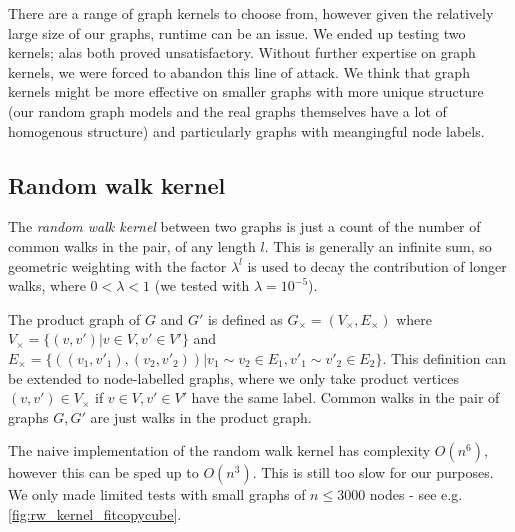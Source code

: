 




There are a range of graph kernels to choose from, however given the relatively large size of our graphs, runtime can be an issue. We ended up testing two kernels; alas both proved unsatisfactory. Without further expertise on graph kernels, we were forced to abandon this line of attack. We think that graph kernels might be more effective on smaller graphs with more unique structure (our random graph models and the real graphs themselves have a lot of homogenous structure) and particularly graphs with meangingful node labels.

\subsection{Random walk kernel}
The \textit{random walk kernel} between two graphs is just a count of the number of common walks in the pair,  of any length $l$. This is generally an infinite sum, so geometric weighting with the factor $\lambda^l$ is used to decay the contribution of longer walks, where $0 < \lambda < 1$ (we tested with $\lambda=10^{-5}$).

The product graph of $G$ and  $G'$ is defined as $G_\times = (V_\times, E_\times)$ where $V_\times = \{(v, v') | v \in V, v' \in V'\}$ and $E_\times = \{((v_1, v'_1), (v_2, v'_2)) | v_1 \sim v_2 \in E_1, v'_1 \sim v'_2 \in E_2\}$. This definition can be extended to node-labelled graphs, where we only take product vertices $(v, v') \in V_\times$ if $v \in V, v' \in V'$ have the same label. Common walks in the pair of graphs $G,G'$ are just walks in the product graph.

The naive implementation of the random walk kernel has complexity $O(n^6)$, however this can be sped up to $O(n^3)$. This is still too slow for our purposes. We only made limited tests with small graphs of $n \leq 3000$ nodes - see e.g. \cref{fig:rw_kernel_fitcopycube}.

